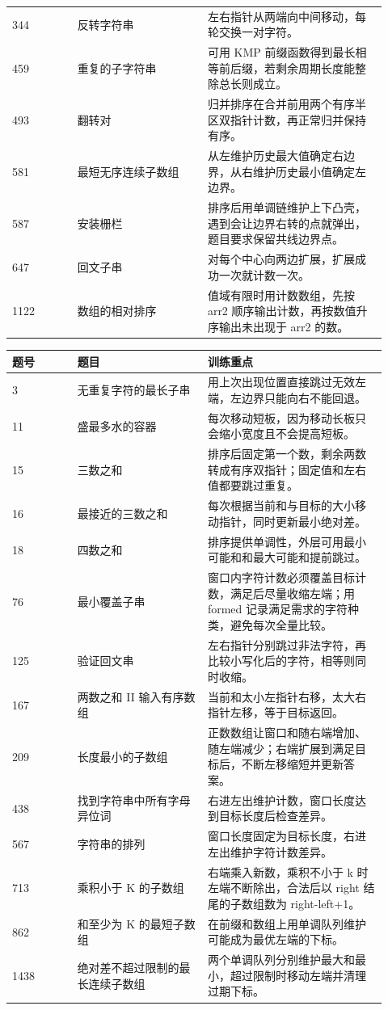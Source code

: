 \begin{longtable}{@{}p{0.16\linewidth}p{0.32\linewidth}p{0.44\linewidth}@{}}
344 & 反转字符串 & 左右指针从两端向中间移动，每轮交换一对字符。\\
459 & 重复的子字符串 & 可用 KMP 前缀函数得到最长相等前后缀，若剩余周期长度能整除总长则成立。\\
493 & 翻转对 & 归并排序在合并前用两个有序半区双指针计数，再正常归并保持有序。\\
581 & 最短无序连续子数组 & 从左维护历史最大值确定右边界，从右维护历史最小值确定左边界。\\
587 & 安装栅栏 & 排序后用单调链维护上下凸壳，遇到会让边界右转的点就弹出，题目要求保留共线边界点。\\
647 & 回文子串 & 对每个中心向两边扩展，扩展成功一次就计数一次。\\
1122 & 数组的相对排序 & 值域有限时用计数数组，先按 arr2 顺序输出计数，再按数值升序输出未出现于 arr2 的数。\\
\bottomrule
\end{longtable}


\begin{longtable}{@{}p{0.16\linewidth}p{0.32\linewidth}p{0.44\linewidth}@{}}
\toprule
题号 & 题目 & 训练重点\\
\midrule
\endhead
3 & 无重复字符的最长子串 & 用上次出现位置直接跳过无效左端，左边界只能向右不能回退。\\
11 & 盛最多水的容器 & 每次移动短板，因为移动长板只会缩小宽度且不会提高短板。\\
15 & 三数之和 & 排序后固定第一个数，剩余两数转成有序双指针；固定值和左右值都要跳过重复。\\
16 & 最接近的三数之和 & 每次根据当前和与目标的大小移动指针，同时更新最小绝对差。\\
18 & 四数之和 & 排序提供单调性，外层可用最小可能和和最大可能和提前跳过。\\
76 & 最小覆盖子串 & 窗口内字符计数必须覆盖目标计数，满足后尽量收缩左端；用 formed 记录满足需求的字符种类，避免每次全量比较。\\
125 & 验证回文串 & 左右指针分别跳过非法字符，再比较小写化后的字符，相等则同时收缩。\\
167 & 两数之和 II 输入有序数组 & 当前和太小左指针右移，太大右指针左移，等于目标返回。\\
209 & 长度最小的子数组 & 正数数组让窗口和随右端增加、随左端减少；右端扩展到满足目标后，不断左移缩短并更新答案。\\
438 & 找到字符串中所有字母异位词 & 右进左出维护计数，窗口长度达到目标长度后检查差异。\\
567 & 字符串的排列 & 窗口长度固定为目标长度，右进左出维护字符计数差异。\\
713 & 乘积小于 K 的子数组 & 右端乘入新数，乘积不小于 k 时左端不断除出，合法后以 right 结尾的子数组数为 right-left+1。\\
862 & 和至少为 K 的最短子数组 & 在前缀和数组上用单调队列维护可能成为最优左端的下标。\\
1438 & 绝对差不超过限制的最长连续子数组 & 两个单调队列分别维护最大和最小，超过限制时移动左端并清理过期下标。\\
\bottomrule
\end{longtable}

